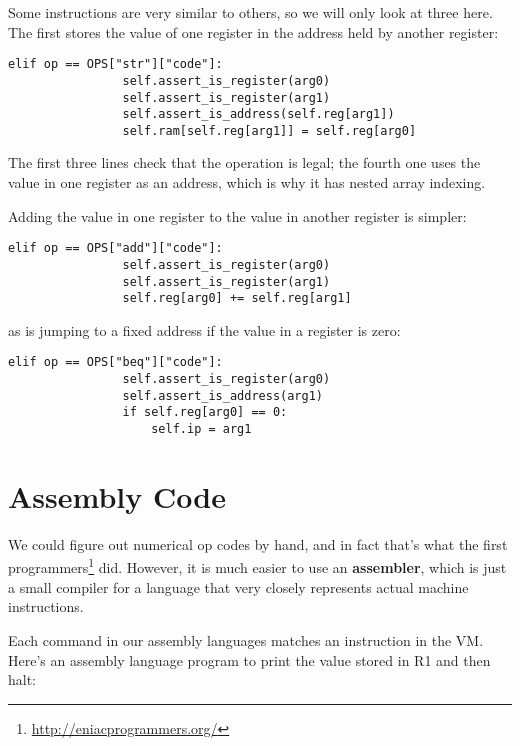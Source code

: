 \documentclass{scrbook}
\newcommand{\glossref}[1]{\textbf{#1}}
\newcommand{\hreffoot}[2]{{#1}\footnote{\href{#2}{#2}}}
\begin{document}
Some instructions are very similar to others,
so we will only look at three here.
The first stores the value of one register in the address held by another register:


\begin{lstlisting}[frame=single,frameround=tttt]
            elif op == OPS["str"]["code"]:
                self.assert_is_register(arg0)
                self.assert_is_register(arg1)
                self.assert_is_address(self.reg[arg1])
                self.ram[self.reg[arg1]] = self.reg[arg0]
\end{lstlisting}



\noindent The first three lines check that the operation is legal;
the fourth one uses the value in one register as an address,
which is why it has nested array indexing.


Adding the value in one register to the value in another register is simpler:


\begin{lstlisting}[frame=single,frameround=tttt]
            elif op == OPS["add"]["code"]:
                self.assert_is_register(arg0)
                self.assert_is_register(arg1)
                self.reg[arg0] += self.reg[arg1]
\end{lstlisting}



\noindent as is jumping to a fixed address if the value in a register is zero:


\begin{lstlisting}[frame=single,frameround=tttt]
            elif op == OPS["beq"]["code"]:
                self.assert_is_register(arg0)
                self.assert_is_address(arg1)
                if self.reg[arg0] == 0:
                    self.ip = arg1
\end{lstlisting}


\section{Assembly Code}\label{vm-assembly}


We could figure out numerical op codes by hand,
and in fact that's what \hreffoot{the first programmers}{http://eniacprogrammers.org/} did.
However,
it is much easier to use an \glossref{assembler},
which is just a small compiler for a language
that very closely represents actual machine instructions.


Each command in our assembly languages matches an instruction in the VM.
Here's an assembly language program to print the value stored in R1 and then halt:
\end{document}
